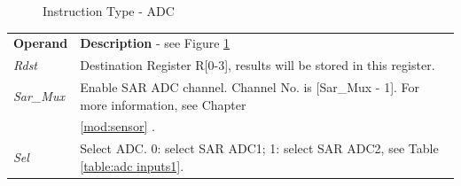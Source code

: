 \documentclass[main\_\_EN.tex]{subfiles}
\begin{document}
%
%
%
%
%
\begin{figure}[!ht ]
    \centering
    \caption{Instruction Type - ADC}
    \label{figure:ADC}
\end{figure}

\begin{tabular}{ l l }
\textbf{Operand} & \textbf{Description} - see Figure \ref{figure:ADC} \\
\textit{Rdst} & Destination Register R[0-3], results will be stored in this register.\\
\textit{Sar\_Mux} & Enable SAR ADC channel. Channel No. is [Sar\_Mux - 1]. For more information, see Chapter \\

& \ref{mod:sensor} \textit{\nameref{mod:sensor}}. \\
\textit{Sel} & Select ADC. 0: select SAR ADC1; 1: select SAR ADC2, see Table \ref{table:adc inputs1}. \\
\end{tabular}
\end{document}
